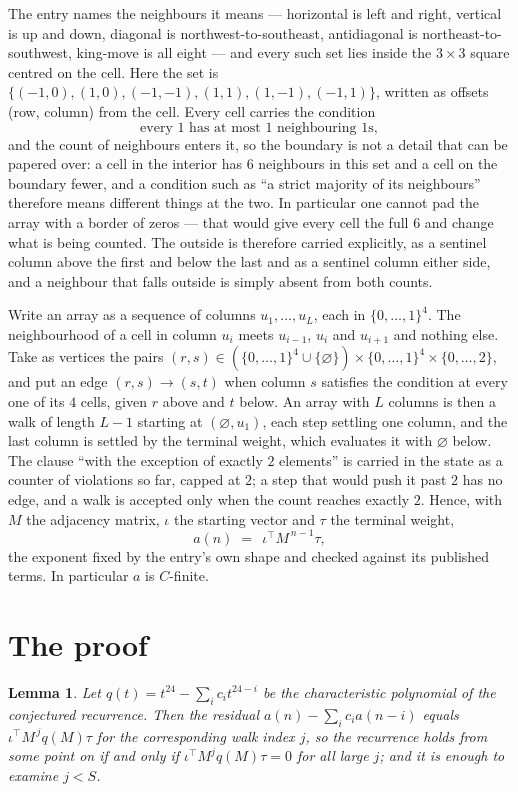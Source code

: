 \documentclass[11pt,a4paper]{article}
\theoremstyle{plain}
\newtheorem{lemma}[theorem]{Lemma}
\theoremstyle{definition}
\begin{document}
The entry names the neighbours it means --- horizontal is left and right, vertical is up and
down, diagonal is northwest-to-southeast, antidiagonal is northeast-to-southwest, king-move is
all eight --- and every such set lies inside the $3\times3$ square centred on the cell. Here
the set is $\{(-1,0), (1,0), (-1,-1), (1,1), (1,-1), (-1,1)\}$, written as offsets (row, column) from the cell. Every cell carries
the condition
\[
\text{every 1 has at most 1 neighbouring 1s},
\]
and the count of neighbours enters it, so the boundary is not a detail that can be papered
over: a cell in the interior has $6$ neighbours in this set and a cell on the boundary
fewer, and a condition such as ``a strict majority of its neighbours'' therefore means
different things at the two. In particular one cannot pad the array with a border of zeros ---
that would give every cell the full $6$ and change what is being counted. The outside is
therefore carried
explicitly, as a sentinel column above the first and below the last and as a sentinel column
either side, and a neighbour that falls outside is simply absent from both counts.

Write an array as a sequence of columns $u_1,\dots,u_L$, each in
$\{0,\dots,1\}^{4}$. The neighbourhood of a cell in column $u_i$ meets $u_{i-1}$,
$u_i$ and $u_{i+1}$ and nothing else. Take as vertices the pairs
$(r,s)\in(\{0,\dots,1\}^{4}\cup\{\varnothing\})\times\{0,\dots,1\}^{4} \times \{0,\dots,2\}$,
and put an edge $(r,s)\to(s,t)$ when column $s$ satisfies the condition at every one of its
$4$ cells, given $r$ above and $t$ below. An array with $L$ columns is then a walk of length
$L-1$ starting at $(\varnothing,u_1)$, each step settling one column, and the last column is
settled by the terminal weight, which evaluates it with $\varnothing$ below. The clause ``with the exception of exactly $2$ elements'' is carried in
the state as a counter of violations so far, capped at $2$; a step that would push it past
$2$ has no edge, and a walk is accepted only when the count reaches exactly $2$. Hence,
with $M$ the adjacency matrix, $\iota$ the starting vector and $\tau$ the terminal weight,
\[
a(n)\;=\;\,\iota^{\!\top}M^{\,n-1}\tau ,
\]
the exponent fixed by the entry's own shape and checked against its published terms. In
particular $a$ is $C$-finite.

\section{The proof}

\begin{lemma}\label{lem:crit}
Let $q(t)=t^{24}-\sum_i c_it^{24-i}$ be the characteristic polynomial of the
conjectured recurrence. Then the residual $a(n)-\sum_ic_ia(n-i)$ equals
$\iota^{\!\top}M^{\,j}q(M)\tau$ for the corresponding walk index $j$, so the
recurrence holds from some point on if and only if $\iota^{\!\top}M^{j}q(M)\tau=0$ for all
large $j$; and it is enough to examine $j<S$.
\end{lemma}
\end{document}
